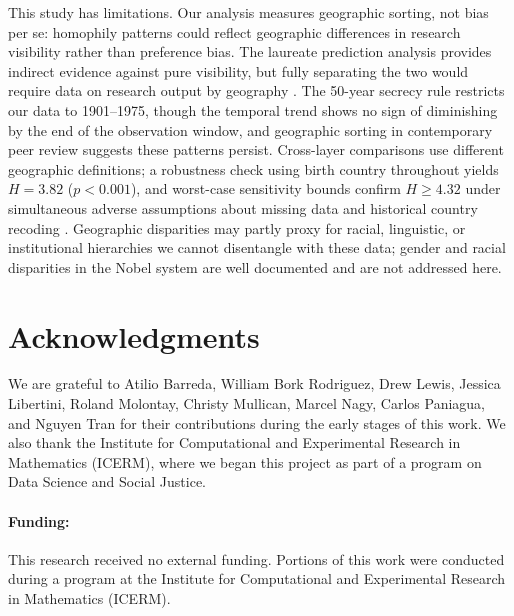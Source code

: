 \documentclass[12pt]{article}
\begin{document}
This study has limitations. Our analysis measures geographic sorting, not bias per se: homophily patterns could reflect geographic differences in research visibility rather than preference bias. The laureate prediction analysis provides indirect evidence against pure visibility, but fully separating the two would require data on research output by geography \cite{Sha1994}. The 50-year secrecy rule restricts our data to 1901--1975, though the temporal trend shows no sign of diminishing by the end of the observation window, and geographic sorting in contemporary peer review \cite{ZumTep2025} suggests these patterns persist. Cross-layer comparisons use different geographic definitions; a robustness check using birth country throughout yields $H = 3.82$ ($p < 0.001$), and worst-case sensitivity bounds confirm $H \geq 4.32$ under simultaneous adverse assumptions about missing data and historical country recoding \cite{methods}. Geographic disparities may partly proxy for racial, linguistic, or institutional hierarchies we cannot disentangle with these data; gender and racial disparities in the Nobel system are well documented \cite{LunJenJau2019, NeiVueVue2024} and are not addressed here.


\clearpage

\nocite{KINA,KarolinskaEmployees,Ledamotsregister,NPPWiki,NobelCommitteeChemistry,NobelCommitteePhysics,NobelCommitteePhysiology,NobelPrizeWebsite,NobelPrizeWebsiteFull,NorwegianNobelCommittee,RSAS,wikidata}





\section*{Acknowledgments}

We are grateful to Atilio Barreda, William Bork Rodriguez, Drew Lewis, Jessica Libertini, Roland Molontay, Christy Mullican, Marcel Nagy, Carlos Paniagua, and Nguyen Tran for their contributions during the early stages of this work. We also thank the Institute for Computational and Experimental Research in Mathematics (ICERM), where we began this project as part of a program on Data Science and Social Justice.

\paragraph*{Funding:} This research received no external funding. Portions of this work were conducted during a program at the Institute for Computational and Experimental Research in Mathematics (ICERM).
\end{document}
